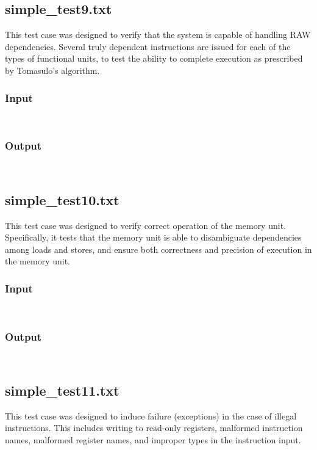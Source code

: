 \documentclass[12pt]{article}
\begin{document}
\subsection{simple\_test9.txt}
This test case was designed to verify that the system is capable of handling RAW dependencies.  Several truly dependent instructions are issued for each of the types of functional units, to test the ability to complete execution as prescribed by Tomasulo's algorithm.

\subsubsection*{Input}
\begin{verbatim}
    
\end{verbatim}

\subsubsection*{Output}
\begin{verbatim}
    
\end{verbatim}

\subsection{simple\_test10.txt}
This test case was designed to verify correct operation of the memory unit.  Specifically, it tests that the memory unit is able to disambiguate dependencies among loads and stores, and ensure both correctness and precision of execution in the memory unit.

\subsubsection*{Input}
\begin{verbatim}
    
\end{verbatim}

\subsubsection*{Output}
\begin{verbatim}
    
\end{verbatim}

\subsection{simple\_test11.txt}
This test case was designed to induce failure (exceptions) in the case of illegal instructions.  This includes writing to read-only registers, malformed instruction names, malformed register names, and improper types in the instruction input.
\end{document}
